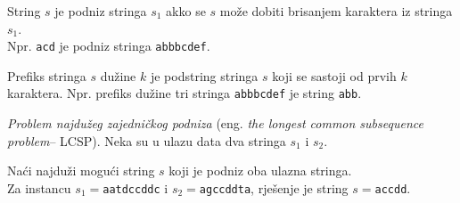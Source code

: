  \begin{definition}
 	String $s$ je podniz stringa $s_1$ akko se $s$ može dobiti brisanjem
 	karaktera iz stringa $s_1$. \\
 	Npr.  \texttt{acd} je podniz stringa \texttt{abbbcdef}.   
 	
 	Prefiks stringa $s$ dužine $k$ je podstring stringa $s$ koji se sastoji od prvih $k$ karaktera. Npr. prefiks dužine tri stringa \texttt{abbbcdef} je string \texttt{abb}. 
 	
 \end{definition}
 
 \begin{example}
 	\textit{Problem najdužeg zajedničkog podniza} (eng. \textit{the longest common subsequence problem}-- LCSP).  Neka su u ulazu data dva stringa $s_1$ i $s_2$. 
 	
 	Naći najduži mogući string $s$ koji je podniz oba ulazna stringa.  \\
 	
 	Za instancu $s_1=$\texttt{aatdccddc} i $s_2=$\texttt{agccddta}, rješenje je string $s=$\texttt{accdd}. 
 	
 \end{example}

